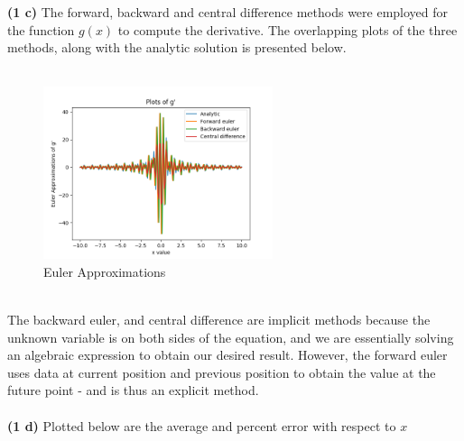 \documentclass[12pt]{article}
\begin{document}
\textbf{(1 c)} The forward, backward and central difference methods were employed for the function $g(x)$ to compute the derivative. The overlapping plots of the three methods, along with the analytic solution is presented below. 
\\\\
\begin{figure}[h]
	\centering
	\includegraphics[width=0.60\textwidth]{gprimeeulerplot.png}
	\caption{Euler Approximations}
\end{figure}\\
The backward euler, and central difference are implicit methods because the unknown variable is on both sides of the equation, and we are essentially solving an algebraic expression to obtain our desired result. However, the forward euler uses data at current position and previous position to obtain the value at the future point - and is thus an explicit method. \\\\  
\textbf{(1 d)} Plotted below are the average and percent error with respect to $x$ 
\end{document}
